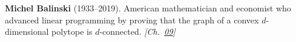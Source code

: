 \textbf{Michel Balinski} (1933–2019). American mathematician and economist who advanced linear programming by proving that the graph of a convex $d$-dimensional polytope is $d$-connected. \emph{[Ch.~\hyperref[ch:arrowtheoremtopology]{09}]}

